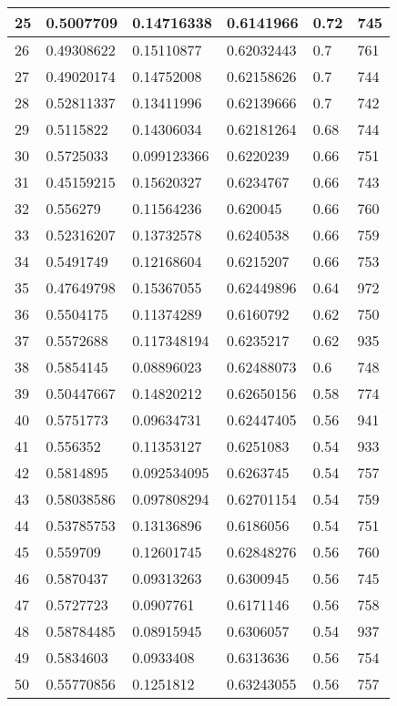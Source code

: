 \begin{longtable}{|l|l|l|l|l|l|}
25 & 0.5007709 & 0.14716338 & 0.6141966 & 0.72 & 745 \\ \hline 
26 & 0.49308622 & 0.15110877 & 0.62032443 & 0.7 & 761 \\ \hline 
27 & 0.49020174 & 0.14752008 & 0.62158626 & 0.7 & 744 \\ \hline 
28 & 0.52811337 & 0.13411996 & 0.62139666 & 0.7 & 742 \\ \hline 
29 & 0.5115822 & 0.14306034 & 0.62181264 & 0.68 & 744 \\ \hline 
30 & 0.5725033 & 0.099123366 & 0.6220239 & 0.66 & 751 \\ \hline 
31 & 0.45159215 & 0.15620327 & 0.6234767 & 0.66 & 743 \\ \hline 
32 & 0.556279 & 0.11564236 & 0.620045 & 0.66 & 760 \\ \hline 
33 & 0.52316207 & 0.13732578 & 0.6240538 & 0.66 & 759 \\ \hline 
34 & 0.5491749 & 0.12168604 & 0.6215207 & 0.66 & 753 \\ \hline 
35 & 0.47649798 & 0.15367055 & 0.62449896 & 0.64 & 972 \\ \hline 
36 & 0.5504175 & 0.11374289 & 0.6160792 & 0.62 & 750 \\ \hline 
37 & 0.5572688 & 0.117348194 & 0.6235217 & 0.62 & 935 \\ \hline 
38 & 0.5854145 & 0.08896023 & 0.62488073 & 0.6 & 748 \\ \hline 
39 & 0.50447667 & 0.14820212 & 0.62650156 & 0.58 & 774 \\ \hline 
40 & 0.5751773 & 0.09634731 & 0.62447405 & 0.56 & 941 \\ \hline 
41 & 0.556352 & 0.11353127 & 0.6251083 & 0.54 & 933 \\ \hline 
42 & 0.5814895 & 0.092534095 & 0.6263745 & 0.54 & 757 \\ \hline 
43 & 0.58038586 & 0.097808294 & 0.62701154 & 0.54 & 759 \\ \hline 
44 & 0.53785753 & 0.13136896 & 0.6186056 & 0.54 & 751 \\ \hline 
45 & 0.559709 & 0.12601745 & 0.62848276 & 0.56 & 760 \\ \hline 
46 & 0.5870437 & 0.09313263 & 0.6300945 & 0.56 & 745 \\ \hline 
47 & 0.5727723 & 0.0907761 & 0.6171146 & 0.56 & 758 \\ \hline 
48 & 0.58784485 & 0.08915945 & 0.6306057 & 0.54 & 937 \\ \hline 
49 & 0.5834603 & 0.0933408 & 0.6313636 & 0.56 & 754 \\ \hline 
50 & 0.55770856 & 0.1251812 & 0.63243055 & 0.56 & 757 \\ \hline 
\end{longtable}